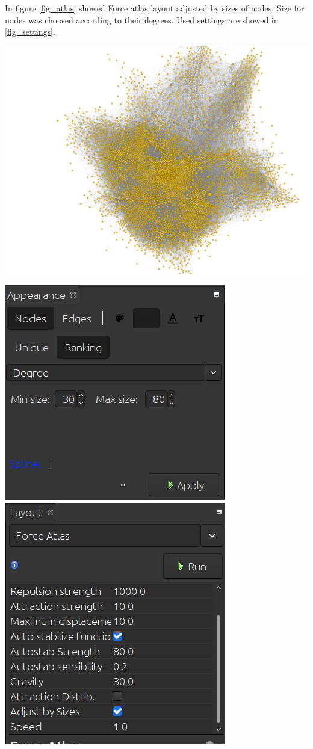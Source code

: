 In figure \ref{fig_atlas} showed Force atlas layout adjusted by sizes of nodes. Size for nodes was choosed according to their degrees. Used settings are showed in \ref{fig_settings}.

\begin{center}
    \includegraphics[width=0.75\linewidth]{../results/layout_3.png}
    \label{fig_atlas}
\end{center}

\begin{center}
    \includegraphics[width=0.4\linewidth]{../results/nodes_ranking.png}
    \includegraphics[width=0.4\linewidth]{../results/layout_settings.png}
    \label{fig_settings}
\end{center}

